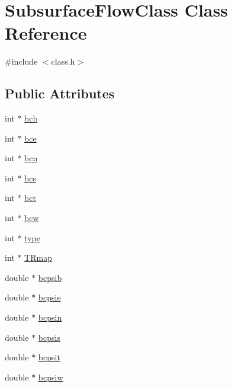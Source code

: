 \hypertarget{class_subsurface_flow_class}{}\section{Subsurface\+Flow\+Class Class Reference}
\label{class_subsurface_flow_class}


{\ttfamily \#include $<$class.\+h$>$}

\subsection*{Public Attributes}
\begin{DoxyCompactItemize}
\item 
int $\ast$ \hyperlink{class_subsurface_flow_class_a91619908d47d2ade915eed711df6aed6}{bcb}
\item 
int $\ast$ \hyperlink{class_subsurface_flow_class_ac114acbd855aea25f3e2de82689b0948}{bce}
\item 
int $\ast$ \hyperlink{class_subsurface_flow_class_a8a76c4416483e0b88ade3118cc243b64}{bcn}
\item 
int $\ast$ \hyperlink{class_subsurface_flow_class_a44291f370275ff43e65a9b8f6529b2ce}{bcs}
\item 
int $\ast$ \hyperlink{class_subsurface_flow_class_a68fe60aea38b75b6a4fb013043c0ad16}{bct}
\item 
int $\ast$ \hyperlink{class_subsurface_flow_class_a5450cee608ea0b1cde6fff7f3a87b307}{bcw}
\item 
int $\ast$ \hyperlink{class_subsurface_flow_class_ae9ccc23f4e2723b0db19a9b7f57452b7}{type}
\item 
int $\ast$ \hyperlink{class_subsurface_flow_class_aef6ead42cc81c5b49d0d8d64fbd0db39}{T\+Rmap}
\item 
double $\ast$ \hyperlink{class_subsurface_flow_class_aac1ba428ac201c84babc7a263bdc14bd}{bcpsib}
\item 
double $\ast$ \hyperlink{class_subsurface_flow_class_aa64b1a107c0cf8a05793e8c2506d3885}{bcpsie}
\item 
double $\ast$ \hyperlink{class_subsurface_flow_class_a40cc047bb67b108853bdf27bb6d2084f}{bcpsin}
\item 
double $\ast$ \hyperlink{class_subsurface_flow_class_aca9945dc0256472bb4e00bead7a8c428}{bcpsis}
\item 
double $\ast$ \hyperlink{class_subsurface_flow_class_a2b70fc35da592fa51d2af58e9c1213ac}{bcpsit}
\item 
double $\ast$ \hyperlink{class_subsurface_flow_class_abd0a968c8c86b494c99ebbf30007dd2e}{bcpsiw}

\end{DoxyCompactItemize}

